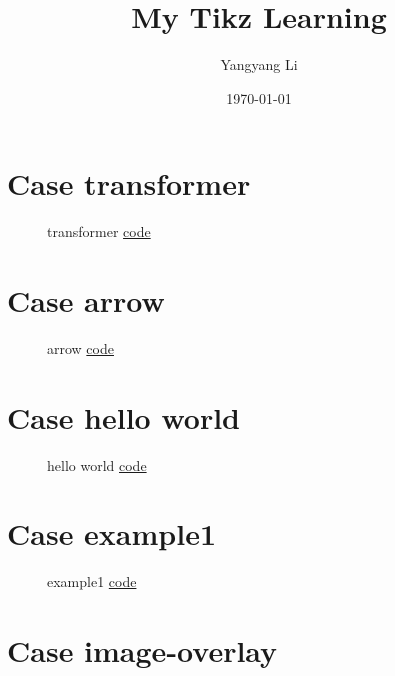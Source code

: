 \documentclass{article}
\title{My Tikz Learning}
\author{Yangyang Li}
\date{\today}
\begin{document}
\maketitle
\clearpage
\tableofcontents


\section{Case transformer}

\begin{figure}[H]
	\centering
	
	\caption{transformer \href{https:/github.com/cauliyang/learn_tikz/blob/main/source/transformer.tex}{code} }
	\label{fig:transformer}
\end{figure}

\section{Case arrow}

\begin{figure}[H]
	\centering
	
	\caption{arrow \href{https:/github.com/cauliyang/learn_tikz/blob/main/source/arrow.tex}{code} }
	\label{fig:arrow}
\end{figure}

\section{Case hello world}

\begin{figure}[H]
	\centering
	
	\caption{hello world \href{https:/github.com/cauliyang/learn_tikz/blob/main/source/hello_world.tex}{code} }
	\label{fig:hello world}
\end{figure}

\section{Case example1}

\begin{figure}[H]
	\centering
	
	\caption{example1 \href{https:/github.com/cauliyang/learn_tikz/blob/main/source/example1.tex}{code} }
	\label{fig:example1}
\end{figure}

\section{Case image-overlay}
\end{document}
